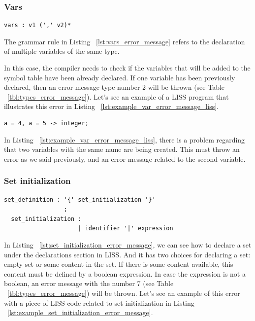 \documentclass[
  oneside,
  11pt, a4paper,
  footinclude=true,
  headinclude=true,
  cleardoublepage=empty
]{scrbook}
\begin{document}
\subsubsection{Vars}

\begin{lstlisting}[label={lst:vars_error_message},caption={Vars rule in LISS}]
  vars : v1 (',' v2)*
\end{lstlisting}

The grammar rule in Listing ~\ref{lst:vars_error_message} refers to the declaration of multiple variables of the same type.

In this case, the compiler needs to check if the variables that will be added to the symbol table have been already declared. If one variable has been previously declared, then an error message type number 2 will be thrown (see Table ~\ref{tbl:types_error_message}).
Let's see an example of a LISS program that illustrates this error in Listing ~\ref{lst:example_var_error_message_liss}.

\begin{lstlisting}[label={lst:example_var_error_message_liss},caption={Example of an error message in LISS for vars non-terminal}]
  a = 4, a = 5 -> integer;
\end{lstlisting}

In Listing ~\ref{lst:example_var_error_message_liss}, there is a problem regarding that two variables with the same name are being created. This must throw an error as we said previously, and an error message related to the second variable.

\subsubsection{Set initialization}

\begin{lstlisting}[label={lst:set_initialization_error_message},caption={Set initialization rule in LISS}]
  set_definition : '{' set_initialization '}'
                 ;
  set_initialization :                    
                     | identifier '|' expression
\end{lstlisting}

In Listing ~\ref{lst:set_initialization_error_message}, we can see how to declare a set under the declarations section in LISS.
And it has two choices for declaring a set: empty set or some content in the set.
If there is some content available, this content must be defined by a boolean expression. In case the expression is not a boolean, an error message with the number 7 (see Table ~\ref{tbl:types_error_message}) will be thrown.
Let's see an example of  this error with a piece of LISS code related to set initialization in Listing ~\ref{lst:example_set_initialization_error_message}.
\end{document}
